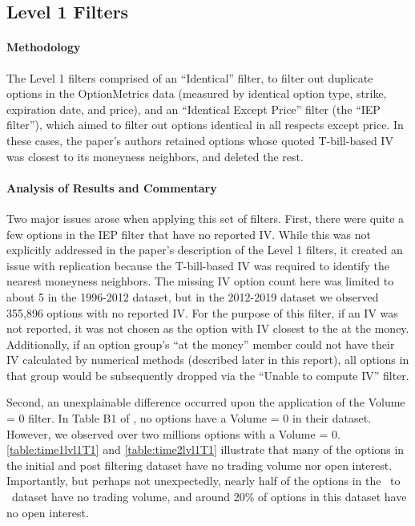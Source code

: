 \subsection{Level 1 Filters} 


\paragraph{Methodology}


The Level 1 filters comprised of an ``Identical'' filter, to filter out duplicate options in the OptionMetrics data (measured by identical option type, strike, expiration date, and price), and an ``Identical Except Price'' filter (the ``IEP filter''), which aimed to filter out options identical in all respects except price. In these cases, the paper's authors retained options whose quoted T-bill-based IV was closest to its moneyness neighbors, and deleted the rest.

\paragraph{Analysis of Results and Commentary}
Two major issues arose when applying this set of filters. First, there were quite a few options in the IEP filter that have no reported IV. While this was not explicitly addressed in the paper's description of the Level 1 filters, it created an issue with replication because the T-bill-based IV was required to identify the nearest moneyness neighbors. The missing IV option count here was limited to about 5 in the 1996-2012 dataset, but in the 2012-2019 dataset we observed 355,896 options with no reported IV. For the purpose of this filter, if an IV was not reported, it was not chosen as the option with IV closest to the at the money. Additionally, if an option group's ``at the money'' member could not have their IV calculated by numerical methods (described later in this report), all options in that group would be subsequently dropped via the ``Unable to compute IV'' filter. 

Second, an unexplainable difference occurred upon the application of the Volume = 0 filter. In Table B1 of \citet{constantinides2013}, no options have a Volume = 0 in their dataset. However, we observed over two millions options with a Volume = 0.   
\autoref{table:time1lvl1T1} and \autoref{table:time2lvl1T1} illustrate that many of the options in the initial and post filtering dataset have no trading volume nor open interest. Importantly, but perhaps not unexpectedly, nearly half of the options in the \STARTONE\ to \ENDONE\ dataset have no trading volume, and around 20\% of options in this dataset have no open interest. 

